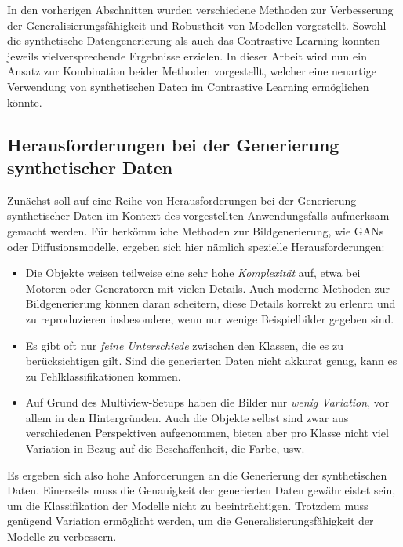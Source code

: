 In den vorherigen Abschnitten wurden verschiedene Methoden zur Verbesserung der Generalisierungsfähigkeit und Robustheit von Modellen vorgestellt. Sowohl die synthetische Datengenerierung als auch das Contrastive Learning konnten jeweils vielversprechende Ergebnisse erzielen. In dieser Arbeit wird nun ein Ansatz zur Kombination beider Methoden vorgestellt, welcher eine neuartige Verwendung von synthetischen Daten im Contrastive Learning ermöglichen könnte.

\subsection{Herausforderungen bei der Generierung synthetischer Daten} \label{subsec:challenges-synt-data}

Zunächst soll auf eine Reihe von Herausforderungen bei der Generierung synthetischer Daten im Kontext des vorgestellten Anwendungsfalls aufmerksam gemacht werden. Für herkömmliche Methoden zur Bildgenerierung, wie GANs oder Diffusionsmodelle, ergeben sich hier nämlich spezielle Herausforderungen:

\begin{itemize}
	\item Die Objekte weisen teilweise eine sehr hohe \emph{Komplexität} auf, etwa bei Motoren oder Generatoren mit vielen Details. Auch moderne Methoden zur Bildgenerierung können daran scheitern, diese Details korrekt zu erlenrn und zu reproduzieren \textemdash insbesondere, wenn nur wenige Beispielbilder gegeben sind.
	\item Es gibt oft nur \emph{feine Unterschiede} zwischen den Klassen, die es zu berücksichtigen gilt. Sind die generierten Daten nicht akkurat genug, kann es zu Fehlklassifikationen kommen.
	\item Auf Grund des Multiview-Setups haben die Bilder nur \emph{wenig Variation}, vor allem in den Hintergründen. Auch die Objekte selbst sind zwar aus verschiedenen Perspektiven aufgenommen, bieten aber pro Klasse nicht viel Variation in Bezug auf die Beschaffenheit, die Farbe, usw.
\end{itemize}

Es ergeben sich also hohe Anforderungen an die Generierung der synthetischen Daten. Einerseits muss die Genauigkeit der generierten Daten gewährleistet sein, um die Klassifikation der Modelle nicht zu beeinträchtigen. Trotzdem muss genügend Variation ermöglicht werden, um die Generalisierungsfähigkeit der Modelle zu verbessern.

